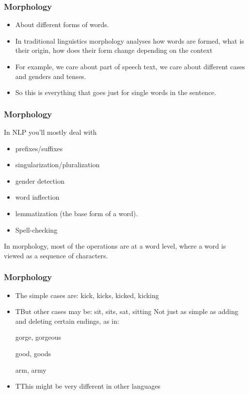 \begin{frame}[fragile]
  \frametitle{Morphology}
  \begin{itemize}
  \item About different forms of words. 
  \item In traditional linguistics morphology analyses how words are formed, what is their origin, how does their form change depending on the context
  \item For example, we care about part of speech text, we care about different cases and genders and tenses. 
  \item So this is everything that goes just for single words in the sentence.
  	  \end{itemize}
 \end{frame} 
 


\begin{frame}[fragile]
  \frametitle{Morphology}
  In NLP you’ll mostly deal with
  \begin{itemize}
  \item prefixes/suffixes
  \item singularization/pluralization
  \item gender detection
  \item word inflection
  \item lemmatization (the base form of a word).
  \item Spell-checking
  	  \end{itemize}
	  
In morphology, most of the operations are at a word level, where a word is viewed as a sequence of characters.	  
 \end{frame} 
 
\begin{frame}[fragile]
  \frametitle{Morphology}
  \begin{itemize}
  \item The simple cases are:
                         kick, kicks, kicked, kicking
  \item TBut other cases may be:
                          sit, sits, sat, sitting
 Not just as simple as adding and deleting certain endings, as in:
 
                         gorge, gorgeous    
						 
                         good, goods    
						 
                         arm, army
  \item TThis might be very different in other languages
  	  \end{itemize}
 \end{frame} 
 
